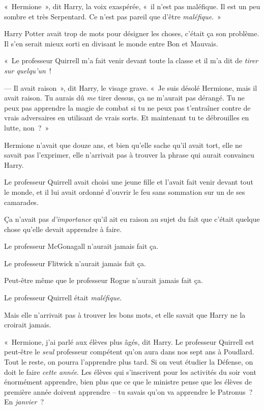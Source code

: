 «~Hermione~», dit Harry, la voix exaspérée, «~il n'est pas maléfique.
Il est un peu sombre et très Serpentard.
Ce n'est pas pareil que d'être \emph{maléfique}.~»

Harry Potter avait trop de mots pour désigner les choses, c'était ça son problème.
Il s'en serait mieux sorti en divisant le monde entre Bon et Mauvais.

«~Le professeur Quirrell m'a fait venir devant toute la classe et il m'a dit de \emph{tirer sur quelqu'un}~!

--- Il avait raison~», dit Harry, le visage grave.
«~Je suis désolé Hermione, mais il avait raison.
Tu aurais dû \emph{me} tirer dessus, ça ne m'aurait pas dérangé.
Tu ne peux pas apprendre la magie de combat si tu ne peux pas t'entraîner contre de vrais adversaires en utilisant de vrais sorts.
Et maintenant tu te débrouilles en lutte, non~?~»

Hermione n'avait que douze ans, et bien qu'elle sache qu'il avait tort, elle ne savait pas l'exprimer, elle n'arrivait pas à trouver la phrase qui aurait convaincu Harry.

Le professeur Quirrell avait choisi une jeune fille et l'avait fait venir devant tout le monde, et il lui avait ordonné d'ouvrir le feu sans sommation sur un de ses camarades.

Ça n'avait pas \emph{d'importance} qu'il ait eu raison au sujet du fait que c'était quelque chose qu'elle devait apprendre à faire.

Le professeur McGonagall n'aurait jamais fait ça.

Le professeur Flitwick n'aurait jamais fait ça.

Peut-être même que le professeur Rogue n'aurait jamais fait ça.

Le professeur Quirrell était \emph{maléfique}.

Mais elle n'arrivait pas à trouver les bons mots, et elle savait que Harry ne la croirait jamais.

«~Hermione, j'ai parlé aux élèves plus âgés, dit Harry.
Le professeur Quirrell est peut-être le \emph{seul} professeur compétent qu'on aura dans nos sept ans à Poudlard.
Tout le reste, on pourra l'apprendre plus tard.
Si on veut étudier la Défense, on doit le faire \emph{cette année}.
Les élèves qui s'inscrivent pour les activités du soir vont énormément apprendre, bien plus que ce que le ministre pense que les élèves de première année doivent apprendre -- tu savais qu'on va apprendre le Patronus~?
En \emph{janvier}~?

